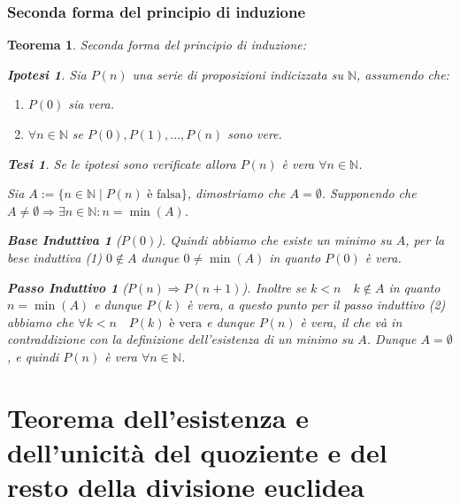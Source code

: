 \documentclass{article}
\makeatletter
\renewenvironment{proof}[1][\proofname]{\par
    \pushQED{\qed}%
    \normalfont \topsep6\p@\@plus6\p@\relax
    \trivlist
    \item\relax
    {\itshape
    #1\@addpunct{.}}\hspace\labelsep\ignorespaces
    }{%
    \popQED\endtrivlist\@endpefalse
}
\newtheorem{theorem}{Teorema}[part]
\newtheorem{ipothesis}[lemma]{Ipotesi}
\newtheorem{thesis}[lemma]{Tesi}
\theoremstyle{definition}
\newtheorem*{base}{Base Induttiva}
\newtheorem*{step}{Passo Induttivo}
\makeatother
\begin{document}
    \section{Seconda forma del principio di induzione}
        \begin{theorem}
            Seconda forma del principio di induzione:
            \begin{ipothesis}
                Sia \(P(n)\) una serie di proposizioni indicizzata su \(\mathbb{N}\), assumendo che:
                \begin{enumerate}
                    \item \(P(0)\) sia vera.
                    \item \(\forall n\in\mathbb{N}\) se \(P(0),P(1),\ldots,P(n)\) sono vere.
                \end{enumerate}
            \end{ipothesis}
            \begin{thesis}
                Se le ipotesi sono verificate allora \(P(n)\) è vera \(\forall n\in\mathbb{N}\).
            \end{thesis}
            \begin{proof}
                Sia \(A:=\{n\in\mathbb{N}\mid P(n)\text{ è falsa}\}\), dimostriamo che \(A=\emptyset\). Supponendo che \(A\neq\emptyset\Rightarrow \exists n\in\mathbb{N}: n=\min (A)\).
                \begin{base}[$P(0)$]
                    Quindi abbiamo che esiste un minimo su \(A\), per la bese induttiva (1) \(0\notin A\) dunque \(0\neq\min (A)\) in quanto \(P(0)\) è vera.
                \end{base}
                \begin{step}[$P(n)\Rightarrow P(n+1)$]
                    Inoltre se \(k<n\quad k\notin A\) in quanto \(n=\min(A)\) e dunque \(P(k)\) è vera, a questo punto per il passo induttivo (2) abbiamo che \(\forall k<n\quad P(k)\text{ è vera}\) e dunque \(P(n)\) è vera, il che và in contraddizione con la definizione dell'esistenza di un minimo su \(A\). Dunque \(A=\emptyset\), e quindi \(P(n)\) è vera \(\forall n\in\mathbb{N}\).
                \end{step}
            \pushQED{}
            \end{proof}
            \raggedleft{\ensuremath{\blacksquare}}
        \end{theorem}
\pagebreak
\part{Teorema dell'esistenza e dell'unicità del quoziente e del resto della divisione euclidea}
\end{document}
